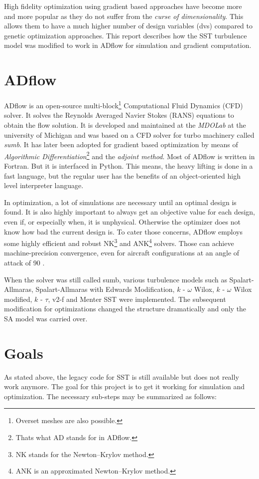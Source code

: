 High fidelity optimization using gradient based approaches have become more
and more popular as they do not suffer from the \textit{curse of
dimensionality}. This allows them to have a much higher number of
design variables (dvs) compared to genetic optimization
approaches. This report describes how the SST turbulence model was modified to
work in ADflow for simulation and gradient computation.



\section{ADflow}
ADflow is an open-source multi-block\footnote{Overset meshes are also
possible.} Computational Fluid Dynamics (CFD) solver. It solves the Reynolds
Averaged Navier Stokes (RANS) equations to obtain the flow solution. It is
developed and maintained at the \textit{MDOLab} at the university of Michigan
and was based on a CFD solver for turbo machinery called \textit{sumb}. It has
later been adopted  for gradient based optimization by means of
\textit{Algorithmic Differentiation}\footnote{Thats what AD stands for in
ADflow.} and the \textit{adjoint method}. Most of ADflow is written in Fortran.
But it is interfaced in Python. This means, the heavy lifting is done in a fast
language, but the regular user has the benefits of an object-oriented high
level interpreter language.

 
In optimization, a lot of simulations are necessary until an optimal design is
found. It is also highly important to always get an objective value for each
design, even if, or especially when, it is unphysical. Otherwise the optimizer
does not know how bad the current design is. To cater those concerns, ADflow
employs some highly efficient and robust NK\footnote{NK stands for the
Newton–Krylov method.} and ANK\footnote{ANK is an approximated Newton–Krylov
method.} solvers. Those can achieve machine-precision convergence, even for
aircraft configurations at an angle of attack of 90\degree \cite{Mader2020a}
\cite{Kenway2019a} \cite{Yildirim2019b}.

When the solver was still called sumb, various turbulence models such as
Spalart-Allmaras, Spalart-Allmaras with Edwards Modification, $k$ - $\omega$
Wilox, $k$ - $\omega$ Wilox modified, $k$ - $\tau$, v2-f and Menter SST were
implemented. The subsequent modification for optimizations changed the
structure dramatically and only the SA model was carried over.


\section{Goals}
As stated above, the legacy code for SST is still available but does not really
work anymore. The goal for this project is to get it working for simulation and
optimization. The necessary sub-steps may be summarized as follows:

